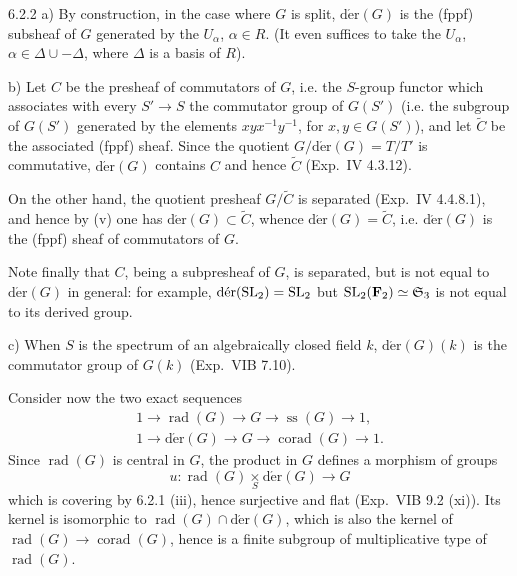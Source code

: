 \begin{remark}{6.2.2}\label{XXII.6.2.2}
a) By construction, in the case where $G$ is split, $\operatorname{d\acute er}(G)$ is the (fppf) subsheaf of $G$ generated by the $U_\alpha$, $\alpha\in R$. (It even suffices to take the $U_\alpha$, $\alpha\in\Delta\cup-\Delta$, where $\Delta$ is a basis of $R$).

b) {\renewcommand{\thefootnote}{(62)}}Let $C$ be the presheaf of commutators of $G$, i.e. the $S$-group functor which associates with every $S'\to S$ the commutator group of $G(S')$ (i.e. the subgroup of $G(S')$ generated by the elements $xyx^{-1}y^{-1}$, for $x,y\in G(S')$), and let $\widetilde C$ be the associated (fppf) sheaf. Since the quotient $G/\operatorname{d\acute er}(G)=T/T'$ is commutative, $\operatorname{d\acute er}(G)$ contains $C$ and hence $\widetilde C$ (\cf Exp.~IV 4.3.12).

On the other hand, the quotient presheaf $G/\widetilde C$ is separated (Exp.~IV 4.4.8.1), and hence by (v) one has $\operatorname{d\acute er}(G)\subset\widetilde C$, whence $\operatorname{d\acute er}(G)=\widetilde C$, i.e. $\operatorname{d\acute er}(G)$ is the (fppf) sheaf of commutators of $G$.

Note finally that $C$, being a subpresheaf of $G$, is separated, but is not equal to $\operatorname{d\acute er}(G)$ in general: for example, $\operatorname{d\acute er}(\operatorname{SL}_2)=\operatorname{SL}_2$ but $\operatorname{SL}_2(\mathbf{F}_2)\simeq\mathfrak S_3$ is not equal to its derived group.

c) When $S$ is the spectrum of an algebraically closed field $k$, $\operatorname{d\acute er}(G)(k)$ is the commutator group of $G(k)$ (Exp.~VIB 7.10).
\end{remark}
\label{XXII.6.2.3}
Consider now the two exact sequences
\[
\begin{gathered}
1\to\operatorname{rad}(G)\to G\to\operatorname{ss}(G)\to1,\\
1\to\operatorname{d\acute er}(G)\to G\to\operatorname{corad}(G)\to1.
\end{gathered}
\]
Since $\operatorname{rad}(G)$ is central in $G$, the product in $G$ defines a morphism of groups
\[
u:\operatorname{rad}(G)\underset S\times\operatorname{d\acute er}(G)\to G
\]
which is covering by 6.2.1 (iii), hence surjective and flat (Exp.~VIB 9.2 (xi)).{\renewcommand{\thefootnote}{(63)}}
Its kernel is isomorphic to $\operatorname{rad}(G)\cap\operatorname{d\acute er}(G)$, which is also the kernel of $\operatorname{rad}(G)\to\operatorname{corad}(G)$, hence is a finite subgroup of multiplicative type of $\operatorname{rad}(G)$.

